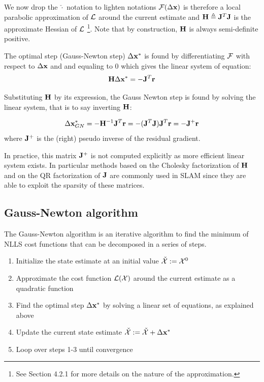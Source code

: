 We now drop the $\check{\cdot}$ notation to lighten notations $\mathcal{F}(\Delta {\bf x})$ is therefore a local parabolic approximation of 
$\mathcal{L}$ around the current estimate and ${\bf H} \triangleq {\bf J}^T {\bf J}$ is the approximate Hessian of $\mathcal{L}$ 
\footnote{See \cite{sola2017course} Section 4.2.1 for more details on the nature of the approximation.}. Note that by construction, ${\bf H}$ is always 
semi-definite positive.

The optimal step (Gauss-Newton step) $\Delta {\bf x}^*$ is found by differentiating $\mathcal{F}$ with respect to $\Delta {\bf x}$ and and equaling to 0 
which gives the linear system of equation:
\begin{equation}
    \bfH \Delta \bfx^* = - \bfJ^T \bfr%
\end{equation}

Substituting ${\bf H}$ by its expression, the Gauss Newton step is found by solving the linear system, that is to say inverting ${\bf H}$:

\begin{equation*}
    \Delta {\bf x}_{GN}^* = - {\bf H}^{-1} {\bf J}^T {\bf r} = - ({\bf J}^T {\bf J}) {\bf J}^T {\bf r} = -  {\bf J}^{+} {\bf r}
\end{equation*}
where ${\bf J}^{+}$ is the (right) pseudo inverse of the residual gradient. 

In practice, this matrix ${\bf J}^{+}$ is not computed explicitly as more efficient linear system exists. In particular methods based on the Cholesky
factorization of ${\bf H}$ and on the QR factorization of ${\bf J}$ are commonly used in SLAM since they are able to exploit the sparsity of these
matrices.


\subsection{Gauss-Newton algorithm}
The Gauss-Newton algorithm is an iterative algorithm to find the minimum of NLLS cost functions that can be decomposed in a series of steps.
\begin{enumerate}
    \item Initialize the state estimate at an initial value $\check{\mathcal{X}} := \mathcal{X}^0$
    \item Approximate the cost function $\mathcal{L}(\mathcal{X})$ around the current estimate as a quadratic function
    \item Find the optimal step $\Delta {\bf x}^*$ by solving a linear set of equations, as explained above
    \item Update the current state estimate $\check{\mathcal{X}} := \check{\mathcal{X}} + \Delta {\bf x}^*$
    \item Loop over steps 1-3 until convergence
\end{enumerate}




